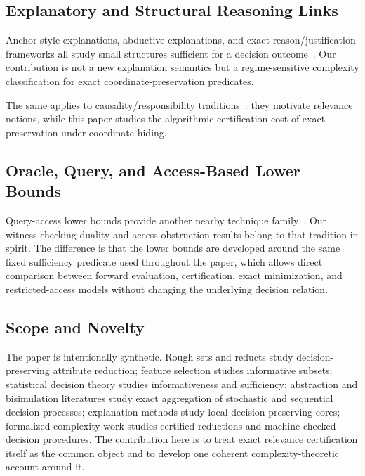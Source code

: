 \subsection{Explanatory and Structural Reasoning Links}

Anchor-style explanations, abductive explanations, and exact reason/justification frameworks all study small structures sufficient for a decision outcome~\cite{ribeiro2018anchors,ignatiev2019abduction,marques2022delivering,darwiche2023reasons}. Our contribution is not a new explanation semantics but a regime-sensitive complexity classification for exact coordinate-preservation predicates.

The same applies to causality/responsibility traditions~\cite{pearl2009causality,spirtes2000causation,halpern2001explanations,chockler2004responsibility}: they motivate relevance notions, while this paper studies the algorithmic certification cost of exact preservation under coordinate hiding.

\subsection{Oracle, Query, and Access-Based Lower Bounds}

Query-access lower bounds provide another nearby technique family~\cite{dobzinski2012query}. Our witness-checking duality and access-obstruction results belong to that tradition in spirit. The difference is that the lower bounds are developed around the same fixed sufficiency predicate used throughout the paper, which allows direct comparison between forward evaluation, certification, exact minimization, and restricted-access models without changing the underlying decision relation.

\subsection{Scope and Novelty}

The paper is intentionally synthetic. Rough sets and reducts study decision-preserving attribute reduction; feature selection studies informative subsets; statistical decision theory studies informativeness and sufficiency; abstraction and bisimulation literatures study exact aggregation of stochastic and sequential decision processes; explanation methods study local decision-preserving cores; formalized complexity work studies certified reductions and machine-checked decision procedures. The contribution here is to treat exact relevance certification itself as the common object and to develop one coherent complexity-theoretic account around it.

